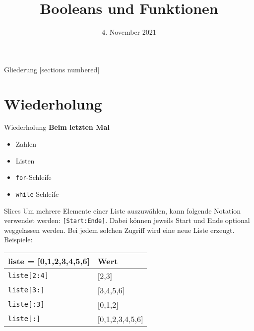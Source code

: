 



\title{Booleans und Funktionen}
\date{4. November 2021}

\usepackage{graphicx}
\usepackage{array}


	
\maketitle

\begin{frame}{Gliederung}
	[sections numbered]
	\tableofcontents
\end{frame}


\section{Wiederholung}
\begin{frame}{Wiederholung}
	\textbf{Beim letzten Mal}
	\begin{itemize}
		\item Zahlen
		\item Listen
		
		\item \alert{\texttt{for}}-Schleife
		
		\item \alert{\texttt{while}}-Schleife
		
	\end{itemize}
\end{frame}

\begin{frame}{Slices}
	Um mehrere Elemente einer Liste auszuwählen, kann folgende Notation verwendet werden: \texttt{[Start:Ende]}. Dabei können jeweils Start und Ende optional weggelassen werden. Bei jedem solchen Zugriff wird eine neue Liste erzeugt.
	\linebreak
	Beispiele:
	\begin{center}
		\begin{tabular}{m{4cm} | m{1cm}}
			\hline\hline
			liste = [0,1,2,3,4,5,6] & Wert \\
			\hline\hline
			\texttt{liste[2:4]} & [2,3] \\
			\texttt{liste[3:]} & [3,4,5,6] \\
			\texttt{liste[:3]} & [0,1,2] \\
			\texttt{liste[:]} & [0,1,2,3,4,5,6]
		\end{tabular}
	\end{center}
\end{frame}

